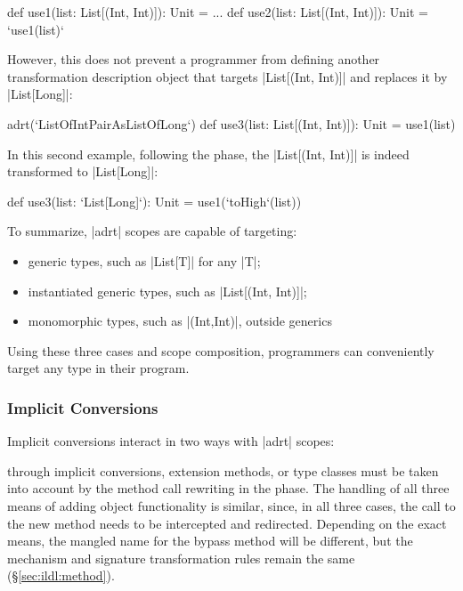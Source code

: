 \begin{lstlisting-nobreak}
def use1(list: List[(Int, Int)]): Unit = ...
def use2(list: List[(Int, Int)]): Unit = `use1(list)`
\end{lstlisting-nobreak}

However, this does not prevent a programmer from defining another transformation description object that targets |List[(Int, Int)]| and replaces it by |List[Long]|:

\begin{lstlisting-nobreak}
adrt(`ListOfIntPairAsListOfLong`) {
  def use3(list: List[(Int, Int)]): Unit = use1(list)
}
\end{lstlisting-nobreak}

In this second example, following the \commit{} phase, the |List[(Int, Int)]| is indeed transformed to |List[Long]|:

\begin{lstlisting-nobreak}
def use3(list: `List[Long]`): Unit = use1(`toHigh`(list))
\end{lstlisting-nobreak}

To summarize, |adrt| scopes are capable of targeting:


\begin{itemize}
\item generic types, such as |List[T]| for any |T|;
\item instantiated generic types, such as |List[(Int, Int)]|;
\item monomorphic types, such as |(Int,Int)|, outside generics
\end{itemize}


\noindent
Using these three cases and scope composition, programmers can conveniently target any type in their program.

\subsubsection*{Implicit Conversions}
\label{sec:ildl:language-implicit-conversions}

Implicit conversions interact in two ways with |adrt| scopes:

\noindent
{} through implicit conversions, extension methods, or type classes must be taken into account by the method call rewriting in the \coerce{} phase. The handling of all three means of adding object functionality is similar, since, in all three cases, the call to the new method needs to be intercepted and redirected. Depending on the exact means, the mangled name for the bypass method will be different, but the mechanism and signature transformation rules remain the same (\S\ref{sec:ildl:method}).


